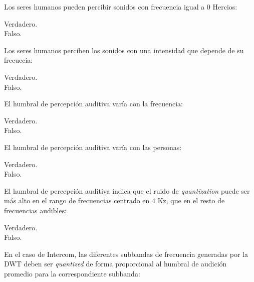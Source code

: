 \documentclass[legalpaper, 12pt, addpoints]{exam}
\begin{document}
\begin{questions}
\vspace{0.10in}

\question Los seres humanos pueden percibir sonidos con frecuencia
igual a 0 Hercios:

\begin{oneparchoices}
  \choice Verdadero.\\
  \choice Falso.
\end{oneparchoices}
  
\vspace{0.10in}

\question Los seres humanos perciben los sonidos con una intensidad
que depende de su frecuecia:

\begin{oneparchoices}
  \choice Verdadero.\\
  \choice Falso.
\end{oneparchoices}
  
\vspace{0.10in}

\question El humbral de percepción auditiva varía con la frecuencia:

\begin{oneparchoices}
  \choice Verdadero.\\
  \choice Falso.
\end{oneparchoices}
  
\vspace{0.10in}

\question El humbral de percepción auditiva varía con las personas:

\begin{oneparchoices}
  \choice Verdadero.\\
  \choice Falso.
\end{oneparchoices}
  
\vspace{0.10in}

\question El humbral de percepción auditiva indica que el ruido de
\emph{quantization} puede ser más alto en el rango de frecuencias
centrado en 4 Kz, que en el resto de frecuencias audibles:

\begin{oneparchoices}
  \choice Verdadero.\\
  \choice Falso.
\end{oneparchoices}
  
\vspace{0.10in}

\question En el caso de Intercom, las diferentes subbandas de
frecuencia generadas por la DWT deben ser \emph{quantized} de forma
proporcional al humbral de audición promedio para la correspondiente
subbanda:


\end{questions}
\end{document}
